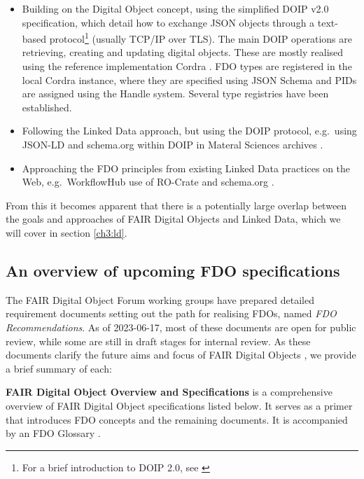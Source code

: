 \begin{itemize}
\tightlist
\item
  Building on the Digital Object concept, using the simplified DOIP v2.0 \cite{DONA 2018} specification, which detail how to exchange JSON objects through a text-based protocol\footnote{For a brief introduction to DOIP 2.0, see \cite{DOIPExamplesCordraa}} (usually TCP/IP over TLS). The main DOIP operations are retrieving, creating and updating digital objects. These are mostly realised using the reference implementation Cordra \cite{tupelo-schneckrobertBriefIntroductionCordra2022}. FDO types are registered in the local Cordra instance, where they are specified using JSON Schema \cite{Draftbhuttonjsonschema} and PIDs are assigned using the Handle system. Several type registries have been established.
\item
  Following the Linked Data approach, but using the DOIP protocol, e.g.~using JSON-LD and schema.org within DOIP in Materal Sciences archives \cite{10.1002/jcc.26842}.
\item
  Approaching the FDO principles from existing Linked Data practices on the Web, e.g.~WorkflowHub use of RO-Crate and schema.org \cite{10.3897/rio.8.e93937}.
\end{itemize}

From this it becomes apparent that there is a potentially large overlap between the goals and approaches of FAIR Digital Objects and Linked Data, which we will cover in section \vref{ch3:ld}.


\subsection{An overview of upcoming FDO specifications}\label{ch3:next-step-fdo}

The FAIR Digital Object Forum \cite{FAIRDigitalObjects} working groups have prepared detailed requirement documents \cite{fdo-Specs} setting out the path for realising FDOs, named \emph{FDO Recommendations}. As of 2023-06-17, most of these documents are open for public review, while some are still in draft stages for internal review. As these documents clarify the future aims and focus of FAIR Digital Objects \cite{fdo-Roadmap}, we provide a brief summary of each:

\textbf{FAIR Digital Object Overview and Specifications} \cite{fdo-Overview} is a comprehensive overview of FAIR Digital Object specifications listed below. It serves as a primer that introduces FDO concepts and the remaining documents. It is accompanied by an FDO Glossary \cite{fdo-Glossary}.


